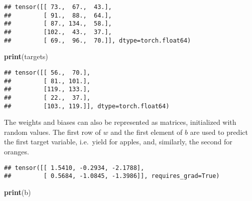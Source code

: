 \documentclass[]{book}
\newenvironment{Shaded}{\begin{snugshade}}{\end{snugshade}}
\newcommand{\CommentTok}[1]{\textcolor[rgb]{0.56,0.35,0.01}{\textit{#1}}}
\newcommand{\DataTypeTok}[1]{\textcolor[rgb]{0.13,0.29,0.53}{#1}}
\newcommand{\KeywordTok}[1]{\textcolor[rgb]{0.13,0.29,0.53}{\textbf{#1}}}
\newcommand{\NormalTok}[1]{#1}
\newcommand{\OperatorTok}[1]{\textcolor[rgb]{0.81,0.36,0.00}{\textbf{#1}}}
\newcommand{\OtherTok}[1]{\textcolor[rgb]{0.56,0.35,0.01}{#1}}
\newcommand{\StringTok}[1]{\textcolor[rgb]{0.31,0.60,0.02}{#1}}
\begin{document}
\begin{verbatim}
## tensor([[ 73.,  67.,  43.],
##         [ 91.,  88.,  64.],
##         [ 87., 134.,  58.],
##         [102.,  43.,  37.],
##         [ 69.,  96.,  70.]], dtype=torch.float64)
\end{verbatim}

\begin{Shaded}
\begin{Highlighting}[]
\KeywordTok{print}\NormalTok{(targets)}
\end{Highlighting}
\end{Shaded}

\begin{verbatim}
## tensor([[ 56.,  70.],
##         [ 81., 101.],
##         [119., 133.],
##         [ 22.,  37.],
##         [103., 119.]], dtype=torch.float64)
\end{verbatim}

The weights and biases can also be represented as matrices, initialized with random values. The first row of \(w\) and the first element of \(b\) are used to predict the first target variable, i.e.~yield for apples, and, similarly, the second for oranges.

\begin{Shaded}
\end{Shaded}

\begin{verbatim}
## tensor([[ 1.5410, -0.2934, -2.1788],
##         [ 0.5684, -1.0845, -1.3986]], requires_grad=True)
\end{verbatim}

\begin{Shaded}
\begin{Highlighting}[]
\KeywordTok{print}\NormalTok{(b)}
\end{Highlighting}
\end{Shaded}
\end{document}
